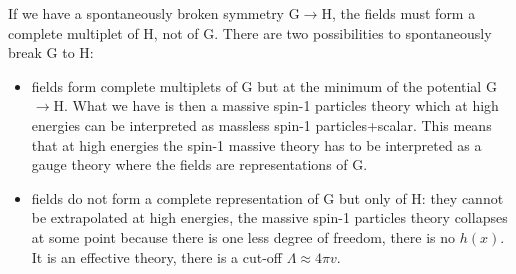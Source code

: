 \documentclass[../main.tex]{subfiles}
\begin{document}
If we have a spontaneously broken symmetry G$\to$H, the fields must form a complete multiplet of H, not of G. There are two possibilities to spontaneously break G to H:
\begin{itemize}
    \item fields form complete multiplets of G but at the minimum of the potential G$\to$H. What we have is then a massive spin-1 particles theory which at high energies can be interpreted as massless spin-1 particles+scalar. This means that at high energies the spin-1 massive theory has to be interpreted as a gauge theory where the fields are representations of G.
    \item fields do not form a complete representation of G but only of H: they cannot be extrapolated at high energies, the massive spin-1 particles theory collapses at some point because there is one less degree of freedom, there is no $h(x)$. It is an effective theory, there is a cut-off $\Lambda\approx4\pi v$.
\end{itemize}
\end{document}
